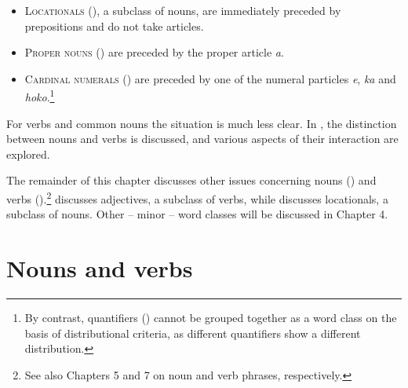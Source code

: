 \begin{itemize}
\item 
\textsc{Locationals} (), a subclass of nouns, are immediately preceded by prepositions and do not take articles.

\item 
\textsc{Proper nouns} () are preceded by the proper article \textit{a}.

\item 
\textsc{Cardinal numerals} () are preceded by one of the numeral particles \textit{e}, \textit{ka} and \textit{hoko}.\footnote{\label{fn:87}By contrast, quantifiers () cannot be grouped together as a word class on the basis of distributional criteria, as different quantifiers show a different distribution.} 

\end{itemize}

For verbs and common nouns the situation is much less clear. In , the distinction between nouns and verbs is discussed, and various aspects of their interaction are explored. 

The remainder of this chapter discusses other issues concerning nouns () and verbs ().\footnote{\label{fn:88}See also Chapters 5 and 7 on noun and verb phrases, respectively.}  discusses adjectives, a subclass of verbs, while  discusses locationals, a subclass of nouns. Other – minor – word classes will be discussed in Chapter 4.

\section{Nouns and verbs}\label{sec:3.2}

